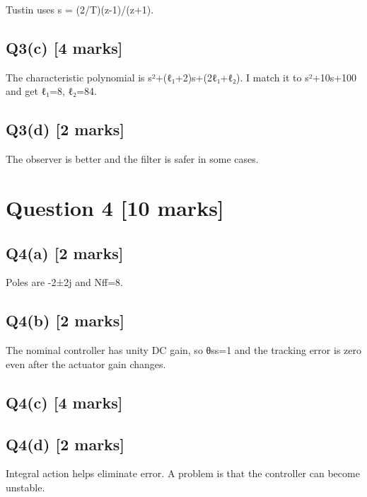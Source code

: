 \documentclass[11pt,a4paper]{article}
\begin{document}
Tustin uses s = (2/T)(z-1)/(z+1).

\subsection*{Q3(c) \hfill [4 marks]}

The characteristic polynomial is s²+(ℓ₁+2)s+(2ℓ₁+ℓ₂).
I match it to s²+10s+100 and get ℓ₁=8, ℓ₂=84.

\subsection*{Q3(d) \hfill [2 marks]}

The observer is better and the filter is safer in some cases.

\section*{Question 4 \hfill [10 marks]}
\subsection*{Q4(a) \hfill [2 marks]}

Poles are -2±2j and Nff=8.

\subsection*{Q4(b) \hfill [2 marks]}

The nominal controller has unity DC gain, so θss=1 and the tracking error is zero even after the actuator gain changes.

\subsection*{Q4(c) \hfill [4 marks]}

\vspace{2mm}

\subsection*{Q4(d) \hfill [2 marks]}

Integral action helps eliminate error.
A problem is that the controller can become unstable.
\end{document}
